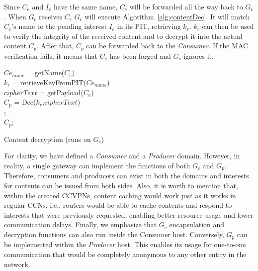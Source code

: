 Since $C_e$ and $I_e$ have the same name, $C_e$ will be forwarded all the way back to $G_c$. When $G_c$  receives $C_e$ $G_c$ will execute Algorithm~\ref{alg:contentDec}. It will match $C_e$'s name to the pending interest $I_e$ in its PIT, retrieving $k_r$. $k_r$ can then be used to verify the integrity of the received content and to decrypt it into the actual content $C_p$. After that, $C_p$ can be forwarded back to the \textit{Consumer}. If the MAC verification fails, it means that $C_e$ has been forged and $G_c$ ignores it.

\begin{algorithm}\label{alg:contentDec}
$Ce_{name}$ = getName($C_e$)\\
$k_r$ = retrieveKeyFromPIT($Ce_{name}$)\\
$cipherText$ = getPayload($C_e$)\\
$C_p$ = Dec($k_r$,$cipherText$)\\
    {
    \Return ;\\
    }
    {\Return $C_p$;\\}
\caption{Content decryption (runs on $G_c$)}
\end{algorithm}

For clarity, we have defined a \textit{Consumer} and a \textit{Producer} domain. However, in reality, a single gateway can implement the functions of both $G_c$ and $G_p$. Therefore, consumers and producers can exist in both the domains and interests for contents can be issued from both sides. Also, it is worth to mention that, within the created CCVPNs, content caching would work just as it works in regular CCNs,  i.e., routers would be able to cache contents and respond to interests that were previously requested, enabling better resource usage and lower communication delays. Finally, we emphasize that $G_c$ encapsulation and decryption functions can also run inside the Consumer host. Conversely, $G_p$ can be implemented within the \textit{Producer} host. This enables its usage for one-to-one communication that would be completely anonymous to any  other entity in the network.

